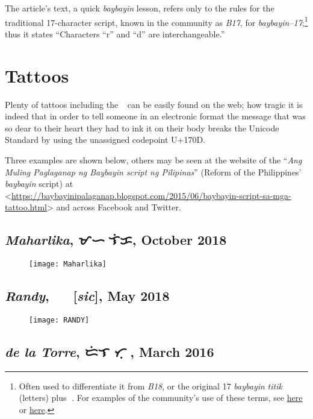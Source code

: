 \documentclass[a4paper,pagesize,openany,14pt,parskip=never]{scrbook}
\newcommand{\≈}{$\approx$}
\newcommand{\ra}{{\baybayin ᜍ}}
\begin{document}
The article's text, a quick {\em baybayin} lesson, refers only to the rules for the traditional 17-character script, known in the community as {\em B17}, for {\em baybayin--17};\footnote{Often used to differentiate it from {\em B18}, or the original 17 {\em baybayin} {\em titik} (letters) plus \ra. For examples of the community's use of these terms, see \href{https://www.facebook.com/groups/tunaynabaybayin/}{here} or \href{https://baybayinfoundry.blogspot.com/2019/03/ba18-baybayin-18-at-simbolong-ra-mula.html}{here}.} thus it states ``Characters “r” and “d” are interchangeable.''

\section{Tattoos}

Plenty of tattoos including the \ra\ can be easily found on the web; how tragic it is indeed that in order to tell someone in an electronic format the message that was so dear to their heart they had to ink it on their body breaks the Unicode Standard by using the unassigned codepoint U+170D.

Three examples are shown below, others may be seen at the website of the ``{\em Ang Muling Paglaganap ng Baybayin script ng Pilipinas}'' (Reform of the Philippines' {\em baybayin} script) at <\url{https://baybayinipalaganap.blogspot.com/2015/06/baybayin-script-sa-mga-tattoo.html}> and across Facebook and Twitter.

\subsection{{\em Maharlika}, {\baybayin ᜋᜑᜍ᜔ᜎᜒᜃ}, October 2018}
\label{Maharlika}
\begin{figure}[H]
\texttt{[image: Maharlika]}
\end{figure}

\subsection{{\em Randy}, {\baybayin ᜍᜈ᜔ᜇ᜔ᜌ᜔} [{\em sic}], May 2018}
\begin{figure}[H]
\texttt{[image: RANDY]}
\end{figure}

\subsection{{\em de la Torre}, {\baybayin ᜇᜒᜎ ᜆᜓᜍᜒ}, March 2016}
\end{document}
